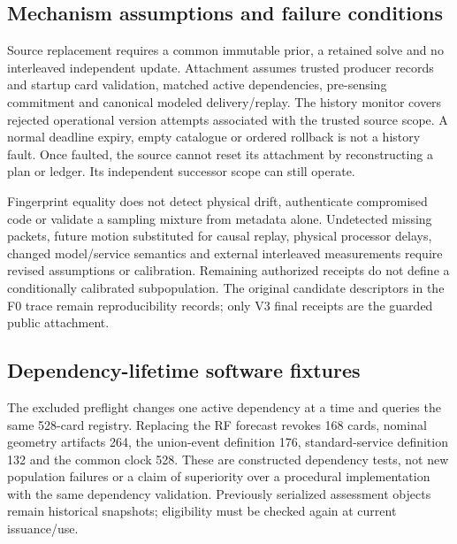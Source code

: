 \subsection{Mechanism assumptions and failure conditions}
Source replacement requires a common immutable prior, a retained solve and no interleaved independent update. Attachment assumes trusted producer records and startup card validation, matched active dependencies, pre-sensing commitment and canonical modeled delivery/replay. The history monitor covers rejected operational version attempts associated with the trusted source scope. A normal deadline expiry, empty catalogue or ordered rollback is not a history fault. Once faulted, the source cannot reset its attachment by reconstructing a plan or ledger. Its independent successor scope can still operate.

Fingerprint equality does not detect physical drift, authenticate compromised code or validate a sampling mixture from metadata alone. Undetected missing packets, future motion substituted for causal replay, physical processor delays, changed model/service semantics and external interleaved measurements require revised assumptions or calibration. Remaining authorized receipts do not define a conditionally calibrated subpopulation. The original candidate descriptors in the F0 trace remain reproducibility records; only V3 final receipts are the guarded public attachment.

\subsection{Dependency-lifetime software fixtures}
The excluded preflight changes one active dependency at a time and queries the same 528-card registry. Replacing the RF forecast revokes 168 cards, nominal geometry artifacts 264, the union-event definition 176, standard-service definition 132 and the common clock 528. These are constructed dependency tests, not new population failures or a claim of superiority over a procedural implementation with the same dependency validation. Previously serialized assessment objects remain historical snapshots; eligibility must be checked again at current issuance/use.
